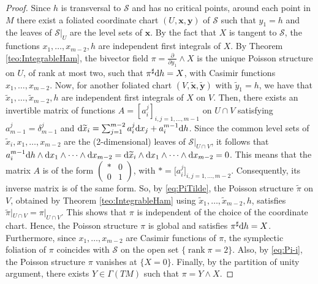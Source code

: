 \documentclass[10pt,a4paper]{amsart}
\newcommand{\dd}{{\rm d}}
\numberwithin{equation}{section}
\begin{document}
\begin{proof}
Since $h$ is transversal to $\mathcal{S}$ and has no critical points, around each point in $M$ there exist a foliated coordinate chart $(U,\boldsymbol{x},\boldsymbol{y})$ of $\mathcal{S}$ such that $y_1=h$ and the leaves of $\mathcal{S}|_{U}$ are the level sets of $\boldsymbol{x}$. By the fact that $X$ is tangent to $\mathcal{S}$, the functions $x_1,\dots,x_{m-2},h$ are independent first integrals of $X$. By Theorem \ref{teo:IntegrableHam}, the bivector field $\pi=\frac{\partial}{\partial y_1}\wedge X$ is the unique Poisson structure on $U$, of rank at most two, such that $\pi^{\sharp}\dd h=X$, with Casimir functions $x_{1}, \dots, x_{m-2}$. Now, for another foliated chart $(V,\widetilde{\boldsymbol{x}},\widetilde{\boldsymbol{y}})$ with $\widetilde{y}_{1}=h$,
we have that $\widetilde{x}_1,\dots, \widetilde{x}_{m-2},h$ are independent first integrals of $X$ on $V$. Then, there exists an invertible matrix of functions $A=[a^{j}_{i}]_{i,j=1,\dots,m-1}$ on $U\cap V$ satisfying $a^{j}_{m-1}=\delta^{j}_{m-1}$ and $\dd \widetilde{x}_{i} = \sum_{j=1}^{m-2}a^{j}_{i}\dd x_{j} + a^{m-1}_{i}\dd h$. Since the common level sets of $\widetilde{x}_{i},x_1,\dots,x_{m-2}$ are the (2-dimensional) leaves of $\mathcal{S}|_{U\cap V}$, it follows that $a^{m-1}_{i}\dd h\wedge\dd x_{1}\wedge\cdots\wedge\dd x_{m-2} = \dd \widetilde{x}_{i}\wedge\dd x_{1}\wedge\cdots\wedge\dd x_{m-2}=0$. This means that the matrix $A$ is of the form $\left(\begin{smallmatrix}
 \ast & 0 \\
 0 & 1
 \end{smallmatrix}\right)$,
with $\ast=\big[a^{j}_{i}\big]_{i,j=1,\dots,m-2}$. Consequently, its inverse matrix is of the same form. So, by \eqref{eq:PiTilde}, the Poisson structure $\widetilde{\pi}$ on $V$, obtained by Theorem \ref{teo:IntegrableHam} using $\widetilde{x}_1,\dots, \widetilde{x}_{m-2},h$, satisfies $\widetilde{\pi}|_{U\cap V}=\pi|_{U\cap V}$. This shows that $\pi$ is independent of the choice of the coordinate chart. Hence, the Poisson structure $\pi$ is global and satisfies $\pi^{\sharp}\dd h=X$. Furthermore, since $x_{1},\dots,x_{m-2}$ are Casimir functions of $\pi$, the symplectic foliation of $\pi$ coincides with $\mathcal{S}$ on the open set $\{\operatorname{rank}\pi = 2\}$. Also, by \eqref{eq:Pi-i}, the Poisson structure $\pi$ vanishes at $\{X=0\}$. Finally, by the partition of unity argument, there exists $Y \in \Gamma(TM)$ such that $\pi=Y \wedge X$.
\end{proof}
\end{document}
